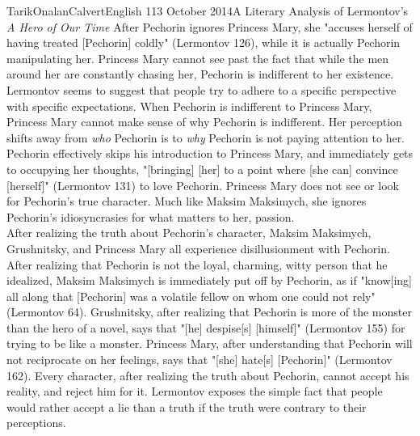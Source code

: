 \documentclass[12pt]{article}
\begin{document}
\begin{mla}{Tarik}{Onalan}{Calvert}{English 1}{13 October 2014}{A Literary Analysis of Lermontov's \textit{A Hero of Our Time}}
        After Pechorin ignores Princess Mary, she "accuses herself of having treated
        [Pechorin] coldly" (Lermontov 126), while it is actually Pechorin manipulating
        her. Princess Mary cannot see past the fact that while the men around her are
        constantly chasing her, Pechorin is indifferent to her existence. Lermontov
        seems to suggest that people try to adhere to a specific perspective with specific
        expectations. When Pechorin is indifferent to Princess Mary, Princess Mary
        cannot make sense of why Pechorin is indifferent. Her perception shifts away
        from \textit{who} Pechorin is to \textit{why} Pechorin is not paying attention
        to her. Pechorin effectively skips his introduction to Princess Mary, and immediately
        gets to occupying her thoughts, "[bringing] [her] to a point where [she can]
        convince [herself]" (Lermontov 131) to love Pechorin. Princess Mary does not
        see or look for Pechorin's true character. Much like Maksim Maksimych, she
        ignores Pechorin's idiosyncrasies for what matters to her, passion.\\

        After realizing the truth about Pechorin's character, Maksim Maksimych, Grushnitsky,
        and Princess Mary all experience disillusionment with Pechorin. After realizing
        that Pechorin is not the loyal, charming, witty person that he idealized, Maksim
        Maksimych is immediately put off by Pechorin, as if "know[ing] all along that
        [Pechorin] was a volatile fellow on whom one could not rely" (Lermontov 64).
        Grushnitsky, after realizing that Pechorin is more of the monster than the
        hero of a novel, says that "[he] despise[s] [himself]" (Lermontov 155) for trying to
        be like a monster. Princess Mary, after understanding that Pechorin will not reciprocate
        on her feelings, says that "[she] hate[s] [Pechorin]" (Lermontov 162). Every character,
        after realizing the truth about Pechorin, cannot accept his reality, and reject
        him for it. Lermontov exposes the simple fact that people would rather accept
        a lie than a truth if the truth were contrary to their perceptions.
    \end{mla}
\end{document}

